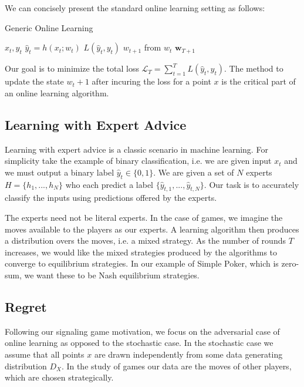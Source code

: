 \documentclass{article}
\begin{document}
We can concisely present the standard online learning setting as follows:

\begin{algorithm}[H]
\caption{Generic Online Learning}
\label{olalgo}
\begin{algorithmic}[1]
    \State {} $x_t , y_t$
    \State {} $\hat{y}_t = h(x_t; w_t)$
    \State {} $L(\hat{y}_t, y_t)$
    \State {} $w_{t+1}$ from $w_t$
\EndFor
\State \Return $\textbf{w}_{T+1}$
\end{algorithmic}
\end{algorithm}
Our goal is to minimize the total loss $\mathcal{L}_T = \sum_{t=1}^T L(\hat{y}_t,y_t)$. The method to update the state $w_t+1$ after incuring the loss for a point $x$ is the critical part of an online learning algorithm.

\subsection{Learning with Expert Advice}

Learning with expert advice is a classic scenario in machine learning. For simplicity take the example of binary classification, i.e. we are given input ${x_t}$ and we must output a binary label $\hat{y}_t \in \lbrace 0,1 \rbrace$. We are given a set of $N$ experts $H = \lbrace h_1,...,h_N \rbrace $ who each predict a label $\lbrace \hat y_{t,1},...,\hat y_{t,N} \rbrace$. Our task is to accurately classify the inputs using predictions offered by the experts.

The experts need not be literal experts. In the case of games, we imagine the moves available to the players as our experts. A learning algorithm then produces a distribution overs the moves, i.e. a mixed strategy. As the number of rounds $T$ increases, we would like the mixed strategies produced by the algorithms to converge to equilibrium strategies. In our example of Simple Poker, which is zero-sum, we want these to be Nash equilibrium strategies.

\subsection{Regret}

Following our signaling game motivation, we focus on the adversarial case of online learning as opposed to the stochastic case. In the stochastic case we assume that all points $x$ are drawn independently from some data generating distribution $D_X$. In the study of games our data are the moves of other players, which are chosen strategically.
\end{document}
